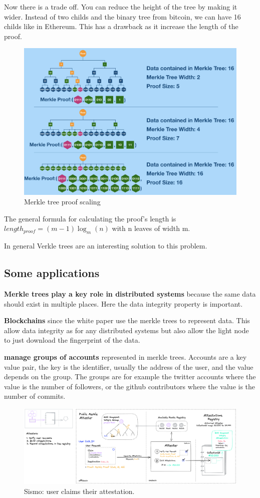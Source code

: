 Now there is a trade off. You can reduce the height of the tree by making it wider. Instead of two childs and the binary tree from bitcoin, we can have 16 childs like in Ethereum. This has a drawback as it increase the length of the proof. 
\begin{figure}[H]
    \centering
    \includegraphics[width=0.7\linewidth]{background/merklescaling.png}
    \caption{Merkle tree proof scaling}
    \label{fig:merklewidth}
\end{figure}

The general formula for calculating the proof's length is $length_{proof}=(m-1)\log_m(n)$ with n leaves of width m.

In general 
Verkle trees \cite{verkle} are an interesting solution to this problem.

\subsection{Some applications}
\textbf{Merkle trees play a key role in distributed systems} because the same data should exist in multiple places. Here the data integrity property is important.

\textbf{Blockchains} since the white paper use the merkle trees to represent data. This allow data integrity as for any distributed systems but also allow the light node to just download the fingerprint of the data.  

\textbf{\cite{sismo} manage groups of accounts} represented in merkle trees. Accounts are a key value pair, the key is the identifier, usually the address of the user, and the value depends on the group. The groups are for example the twitter accounts where the value is the number of followers, or the github contributors where the value is the number of commits. 
\begin{figure}[H]
    \centering
    \includegraphics[width=1.\linewidth]{background/sismo2.png}
    \caption{Sismo: user claims their attestation.}
    \label{fig:sismo}
\end{figure}




